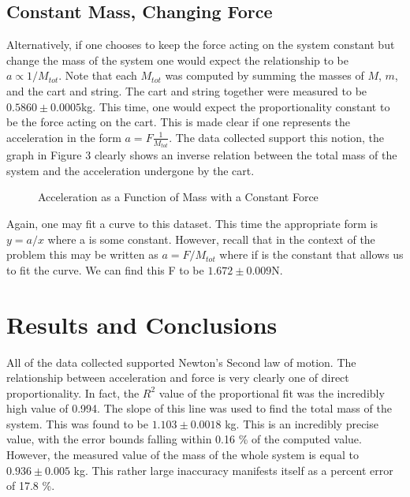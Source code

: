 \documentclass[11pt]{article}
\begin{document}
\subsection{Constant Mass, Changing Force}
Alternatively, if one chooses to keep the force acting on the system constant but change the mass of the system one would expect the relationship to be \(a \propto 1 / M_{tot}\). Note that each \(M_{tot }\) was computed by summing the masses of \(M\), \(m\), and the cart and string. The cart and string together were measured to be \(0.5860 \pm 0.0005 \)kg. This time, one would expect the proportionality constant to be the force acting on the cart. This is made clear if one represents the acceleration in the form \(a = F \frac{1}{M_{tot}}\). The data collected support this notion, the graph in Figure 3 clearly shows an inverse relation between the total mass of the system and the acceleration undergone by the cart.
\begin{figure}[h]
	\centering
	\caption{Acceleration as a Function of Mass with a Constant Force}
\end{figure}

Again, one may fit a curve to this dataset.  This time the appropriate form is \(y = a/x \) where a is some constant. However, recall that in the context of the problem this may be written as \(a = F / M_{tot} \) where if is the constant that allows us to fit the curve. We can find this F to be \(1.672 \pm 0.009 \)N.
\section{Results and Conclusions}
All of the data collected supported Newton's Second law of motion. The relationship between acceleration and force is very clearly one of direct proportionality. In fact, the \(R^2\) value of the proportional fit was the incredibly high value of 0.994. The slope of this line was used to find the total mass of the system. This was found to be \(1.103  \pm 0.0018\) kg. This is an incredibly precise value, with the error bounds falling within 0.16 \% of the computed value. However, the measured value of the mass of the whole system is equal to \(0.936  \pm 0.005\) kg. This rather large inaccuracy manifests itself as a percent error of 17.8 \%.
\end{document}
